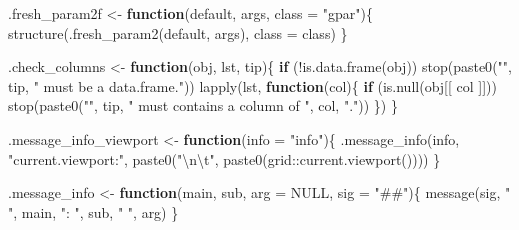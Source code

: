 \documentclass[
]{article}
\newenvironment{Shaded}{\begin{snugshade}}{\end{snugshade}}
\newcommand{\AttributeTok}[1]{\textcolor[rgb]{0.77,0.63,0.00}{#1}}
\newcommand{\ConstantTok}[1]{\textcolor[rgb]{0.00,0.00,0.00}{#1}}
\newcommand{\ControlFlowTok}[1]{\textcolor[rgb]{0.13,0.29,0.53}{\textbf{#1}}}
\newcommand{\FunctionTok}[1]{\textcolor[rgb]{0.00,0.00,0.00}{#1}}
\newcommand{\NormalTok}[1]{#1}
\newcommand{\OtherTok}[1]{\textcolor[rgb]{0.56,0.35,0.01}{#1}}
\newcommand{\SpecialCharTok}[1]{\textcolor[rgb]{0.00,0.00,0.00}{#1}}
\newcommand{\StringTok}[1]{\textcolor[rgb]{0.31,0.60,0.02}{#1}}
\begin{document}
\begin{Shaded}
\begin{Highlighting}[]
\NormalTok{.fresh\_param2f }\OtherTok{\textless{}{-}} 
  \ControlFlowTok{function}\NormalTok{(default, args, }\AttributeTok{class =} \StringTok{"gpar"}\NormalTok{)\{}
    \FunctionTok{structure}\NormalTok{(}\FunctionTok{.fresh\_param2}\NormalTok{(default, args), }\AttributeTok{class =}\NormalTok{ class)}
\NormalTok{  \}}

\NormalTok{.check\_columns }\OtherTok{\textless{}{-}} 
  \ControlFlowTok{function}\NormalTok{(obj, lst, tip)\{}
    \ControlFlowTok{if}\NormalTok{ (}\SpecialCharTok{!}\FunctionTok{is.data.frame}\NormalTok{(obj))}
      \FunctionTok{stop}\NormalTok{(}\FunctionTok{paste0}\NormalTok{(}\StringTok{"\textquotesingle{}"}\NormalTok{, tip, }\StringTok{"\textquotesingle{} must be a \textquotesingle{}data.frame\textquotesingle{}."}\NormalTok{))}
    \FunctionTok{lapply}\NormalTok{(lst, }\ControlFlowTok{function}\NormalTok{(col)\{}
             \ControlFlowTok{if}\NormalTok{ (}\FunctionTok{is.null}\NormalTok{(obj[[ col ]]))}
               \FunctionTok{stop}\NormalTok{(}\FunctionTok{paste0}\NormalTok{(}\StringTok{"\textquotesingle{}"}\NormalTok{, tip, }\StringTok{"\textquotesingle{} must contains a column of \textquotesingle{}"}\NormalTok{, col, }\StringTok{"\textquotesingle{}."}\NormalTok{))}
\NormalTok{           \})}
\NormalTok{  \}}

\NormalTok{.message\_info\_viewport }\OtherTok{\textless{}{-}} 
  \ControlFlowTok{function}\NormalTok{(}\AttributeTok{info =} \StringTok{"info"}\NormalTok{)\{}
    \FunctionTok{.message\_info}\NormalTok{(info, }\StringTok{"current.viewport:"}\NormalTok{,}
                  \FunctionTok{paste0}\NormalTok{(}\StringTok{"}\SpecialCharTok{\textbackslash{}n\textbackslash{}t}\StringTok{"}\NormalTok{, }\FunctionTok{paste0}\NormalTok{(grid}\SpecialCharTok{::}\FunctionTok{current.viewport}\NormalTok{())))}
\NormalTok{  \}}

\NormalTok{.message\_info }\OtherTok{\textless{}{-}} 
  \ControlFlowTok{function}\NormalTok{(main, sub, }\AttributeTok{arg =} \ConstantTok{NULL}\NormalTok{, }\AttributeTok{sig =} \StringTok{"\#\#"}\NormalTok{)\{}
    \FunctionTok{message}\NormalTok{(sig, }\StringTok{" "}\NormalTok{, main, }\StringTok{": "}\NormalTok{, sub, }\StringTok{" "}\NormalTok{, arg)}
\NormalTok{  \}}


\end{Highlighting}
\end{Shaded}
\end{document}
